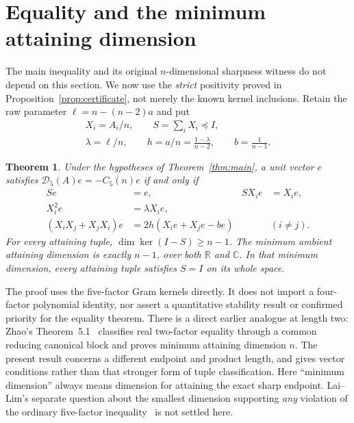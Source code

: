 \documentclass[11pt]{article}
\newtheorem{theorem}{Theorem}
\newcommand{\D}{\mathcal D_5}
\newcommand{\R}{\mathbb R}
\newcommand{\C}{\mathbb C}
\begin{document}
\section{Equality and the minimum attaining dimension}\label{sec:equality}
The main inequality and its original $n$-dimensional sharpness witness
do not depend on this section. We now use the \emph{strict} positivity
proved in Proposition~\ref{prop:certificate}, not merely the known
kernel inclusions. Retain the raw parameter $\ell=n-(n-2)a$ and put
\begin{equation}\label{eq:normalized-equality-parameters}
 \begin{gathered}
 X_i=A_i/n,\qquad S=\sum_iX_i\preceq I,\\
 \lambda=\ell/n,\qquad h=a/n=\frac{1-\lambda}{n-2},\qquad
 b=\frac1{n-1}.
 \end{gathered}
\end{equation}
\begin{theorem}\label{thm:equality}
Under the hypotheses of Theorem~\ref{thm:main}, a unit vector $e$
satisfies $\D(A)e=-C_5(n)e$ if and only if
\begin{align}
 Se&=e,& SX_i e&=X_i e,\label{eq:saturation}\\
 X_i^2e&=\lambda X_i e,\label{eq:quadratic-equality}\\
 (X_iX_j+X_jX_i)e&=2h(X_i e+X_j e-be)&& (i\ne j).
 \label{eq:pair-equality}
\end{align}
For every attaining tuple, $\dim\ker(I-S)\ge n-1$.
The minimum ambient attaining dimension is exactly $n-1$, over
both $\R$ and $\C$. In that minimum dimension, every attaining tuple
satisfies $S=I$ on its whole space.
\end{theorem}
The proof uses the five-factor Gram kernels directly. It does not
import a four-factor polynomial identity, nor assert a quantitative
stability result or confirmed priority for the equality theorem.
There is a direct earlier analogue at length two: Zhao's
Theorem~5.1~\cite{zhao} classifies real two-factor equality through a
common reducing canonical block and proves minimum attaining dimension
$n$. The present result concerns a different endpoint and product length,
and gives vector conditions rather than that stronger form of tuple
classification. Here ``minimum dimension'' always means dimension for
attaining the exact sharp endpoint. Lai--Lim's separate question about
the smallest dimension supporting \emph{any} violation of the ordinary
five-factor inequality~\cite[Section~3]{lai-lim} is not settled here.
\end{document}
